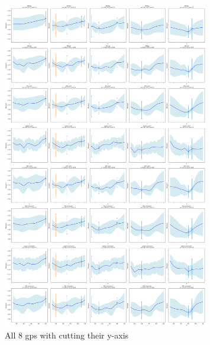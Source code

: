 \documentclass[11pt]{article}
\begin{document}
\begin{figure}[H]
    \centering
    \includegraphics[width=0.8\textwidth]{LatexPlots/final_gps_plots/final_gps_ycuts.png}
    \caption{All 8 gps with cutting their y-axis}
    \label{fig:best8_ycuts}
\end{figure}
\end{document}
